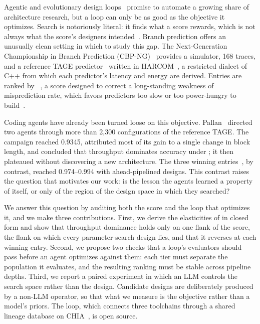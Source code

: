 \documentclass[conference]{IEEEtran}
\newcommand{\vfs}{\text{VFS}}
\begin{document}
Agentic and evolutionary design loops~\cite{alphaevolve,archgym} promise to
automate a growing share of architecture research, but a loop can only be as
good as the objective it optimizes. Search is notoriously literal: it finds what
a score rewards, which is not always what the score's designers
intended~\cite{lehman2020surprising,amodei2016concrete}. Branch prediction offers
an unusually clean setting in which to study this gap. The Next-Generation
Championship in Branch Prediction (CBP-NG)~\cite{cbpng} provides a simulator,
168 traces, and a reference TAGE predictor~\cite{seznec2006tage,seznec2011tage}
written in HARCOM~\cite{harcom}, a restricted dialect of C++ from which each
predictor's latency and energy are derived. Entries are ranked by
\vfs{}~\cite{vfsmetric}, a score designed to correct a long-standing weakness of
misprediction rate, which favors predictors too slow or too power-hungry to
build~\cite{jimenez2000delay,jimenez2003reconsidering}.

Coding agents have already been turned loose on this objective.
Pallan~\cite{pallan} directed two agents through more than 2,300 configurations
of the reference TAGE. The campaign reached 0.9345, attributed most of its gain
to a single change in block length, and concluded that throughput dominates
accuracy under \vfs{}; it then plateaued without discovering a new architecture.
The three winning entries~\cite{koizumi,fan,dang}, by contrast, reached
0.974--0.994 with ahead-pipelined designs. This contrast raises the question
that motivates our work: is the lesson the agents learned a property of \vfs{}
itself, or only of the region of the design space in which they searched?

We answer this question by auditing both the score and the loop that optimizes
it, and we make three contributions. First, we derive the elasticities of
\vfs{} in closed form and show that throughput dominance holds only on one flank
of the score, the flank on which every parameter-search design lies, and that it
reverses at each winning entry. Second, we propose two checks that a loop's
evaluators should pass before an agent optimizes against them: each tier must
separate the population it evaluates, and the resulting ranking must be stable
across pipeline depths. Third, we report a paired experiment in which an LLM
controls the search space rather than the design. Candidate designs are
deliberately produced by a non-LLM operator, so that what we measure is the
objective rather than a model's priors. The loop, which connects three
toolchains through a shared lineage database on CHIA~\cite{chia}, is open source.
\end{document}
